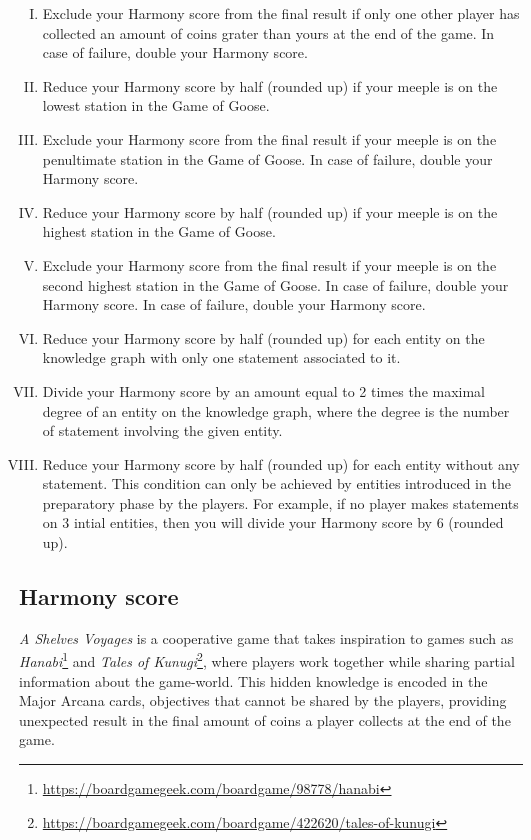 \documentclass{article}
\begin{document}
\begin{multicols}{2}
\begin{enumerate}[I.]
\item Exclude your Harmony score from the final result if only one other player has collected an amount of coins grater than yours at the end of the game. In case of failure, double your Harmony score.
\item Reduce your Harmony score by half (rounded up) if your meeple is on the lowest station in the Game of Goose.
\item Exclude your Harmony score from the final result if your meeple is on the penultimate station in the Game of Goose. In case of failure, double your Harmony score.
\item Reduce your Harmony score by half (rounded up) if your meeple is on the highest station in the Game of Goose.
\item Exclude your Harmony score from the final result if your meeple is on the second highest station in the Game of Goose. In case of failure, double your Harmony score. In case of failure, double your Harmony score.
\item Reduce your Harmony score by half (rounded up) for each entity on the knowledge graph with only one statement associated to it.
\item Divide your Harmony score by an amount equal to 2 times the maximal degree of an entity on the knowledge graph, where the degree is the number of statement involving the given entity.
\item Reduce your Harmony score by half (rounded up) for each entity without any statement. This condition can only be achieved by entities introduced in the preparatory phase by the players. For example, if no player makes statements on 3 intial entities, then you will divide your Harmony score by 6 (rounded up).
\end{enumerate}

\subsection{Harmony score}

\textit{A Shelves Voyages} is a cooperative game that takes inspiration to games such as \textit{Hanabi}\footnote{\url{https://boardgamegeek.com/boardgame/98778/hanabi}} and \textit{Tales of Kunugi}\footnote{\url{https://boardgamegeek.com/boardgame/422620/tales-of-kunugi}}, where players work together while sharing partial information about the game-world. This hidden knowledge is encoded in the Major Arcana cards, objectives that cannot be shared by the players, providing unexpected result in the final amount of coins a player collects at the end of the game.


\end{multicols}
\end{document}

